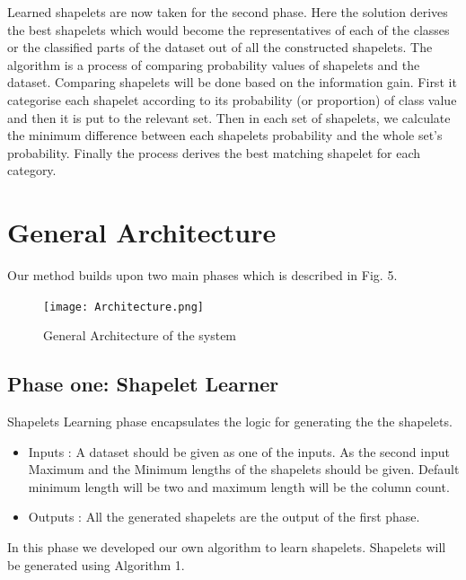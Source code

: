 \documentclass[letterpaper, 10 pt, conference]{IEEEtran}  %
\begin{document}
Learned shapelets are now taken for the second phase. Here the solution derives the best shapelets which would become the representatives of each of the classes or the classified parts of the dataset out of all the constructed shapelets. The algorithm is a process of comparing probability values of shapelets and the dataset. Comparing shapelets will be done based on the information gain. First it categorise each shapelet according to its probability (or proportion) of class value and then it is put to the relevant set. Then in each  set of shapelets, we calculate the minimum difference between each shapelets probability and the whole set’s probability. Finally the process derives the best matching shapelet for each category.

\section{General Architecture}
Our method builds upon two main phases which is described in Fig. 5.
\begin{figure}[h!]
\texttt{[image: Architecture.png]}
\caption{General Architecture of the system}
\end{figure}

\subsection{Phase one: Shapelet Learner}
Shapelets Learning phase encapsulates the logic for generating the the shapelets.
\begin{itemize}
\item Inputs : A dataset should be given as one of the inputs. As the second input Maximum and the Minimum lengths of the shapelets should be given. Default minimum length will be two and maximum length will be the column count.
\item Outputs : All the generated shapelets are the output of the first phase.
\end{itemize}
In this phase we developed our own algorithm to learn shapelets. Shapelets will be generated using Algorithm 1.
\end{document}
